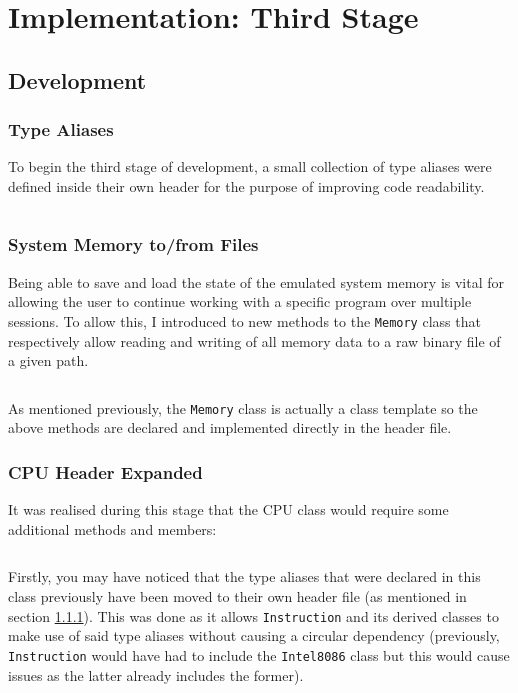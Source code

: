 \section{Implementation: Third Stage}

\subsection{Development}
    \subsubsection{Type Aliases} \label{sec:third-stage-aliases}
        To begin the third stage of development, a small collection of type aliases were defined inside their own header for the purpose of improving code readability.

        \inputminted{c++}{code/third/types.hpp}

    \subsubsection{System Memory to/from Files}
        Being able to save and load the state of the emulated system memory is vital for allowing the user to continue working with a specific program over multiple sessions. To allow this, I introduced to new methods to the \texttt{Memory} class that respectively allow reading and writing of all memory data to a raw binary file of a given path.

        \inputminted{c++}{code/third/memory.hpp}

        As mentioned previously, the \texttt{Memory} class is actually a class template so the above methods are declared and implemented directly in the header file.

    \subsubsection{CPU Header Expanded}
        It was realised during this stage that the CPU class would require some additional methods and members:

        \inputminted{c++}{code/third/intel8086.hpp}

        Firstly, you may have noticed that the type aliases that were declared in this class previously have been moved to their own header file (as mentioned in section \ref{sec:third-stage-aliases}). This was done as it allows \texttt{Instruction} and its derived classes to make use of said type aliases without causing a circular dependency (previously, \texttt{Instruction} would have had to include the \texttt{Intel8086} class but this would cause issues as the latter already includes the former).

